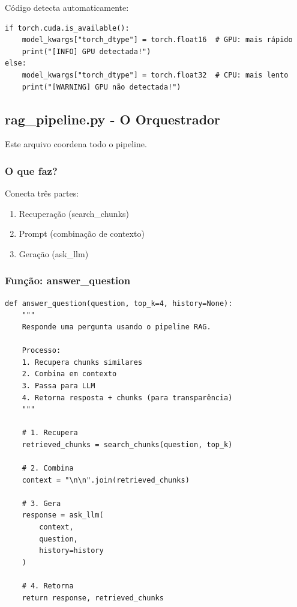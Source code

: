 \documentclass[12pt,a4paper]{article}
\begin{document}
Código detecta automaticamente:

\begin{lstlisting}
if torch.cuda.is_available():
    model_kwargs["torch_dtype"] = torch.float16  # GPU: mais rápido
    print("[INFO] GPU detectada!")
else:
    model_kwargs["torch_dtype"] = torch.float32  # CPU: mais lento
    print("[WARNING] GPU não detectada!")
\end{lstlisting}

\subsection{rag\_pipeline.py - O Orquestrador}

Este arquivo coordena todo o pipeline.

\subsubsection{O que faz?}

Conecta três partes:
\begin{enumerate}
    \item Recuperação (search\_chunks)
    \item Prompt (combinação de contexto)
    \item Geração (ask\_llm)
\end{enumerate}

\subsubsection{Função: answer\_question}

\begin{lstlisting}
def answer_question(question, top_k=4, history=None):
    """
    Responde uma pergunta usando o pipeline RAG.
    
    Processo:
    1. Recupera chunks similares
    2. Combina em contexto
    3. Passa para LLM
    4. Retorna resposta + chunks (para transparência)
    """
    
    # 1. Recupera
    retrieved_chunks = search_chunks(question, top_k)
    
    # 2. Combina
    context = "\n\n".join(retrieved_chunks)
    
    # 3. Gera
    response = ask_llm(
        context,
        question,
        history=history
    )
    
    # 4. Retorna
    return response, retrieved_chunks
\end{lstlisting}
\end{document}
